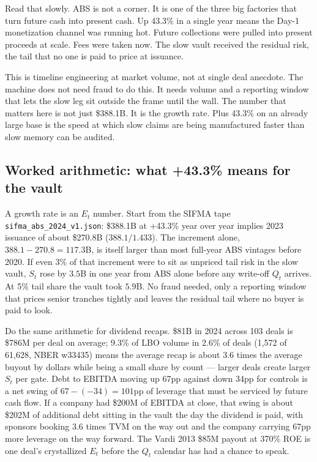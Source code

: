 Read that slowly. ABS is not a corner. It is one of the three big factories that turn future cash into present cash. Up 43.3\% in a single year means the Day-1 monetization channel was running hot. Future collections were pulled into present proceeds at scale. Fees were taken now. The slow vault received the residual risk, the tail that no one is paid to price at issuance.

This is timeline engineering at market volume, not at single deal anecdote. The machine does not need fraud to do this. It needs volume and a reporting window that lets the slow leg sit outside the frame until the wall. The number that matters here is not just \$388.1B. It is the growth rate. Plus 43.3\% on an already large base is the speed at which slow claims are being manufactured faster than slow memory can be audited.

\subsection*{Worked arithmetic: what +43.3\% means for the vault}

A growth rate is an $E_t$ number. Start from the SIFMA tape \texttt{sifma\_abs\_2024\_v1.json}: \$388.1B at +43.3\% year over year implies 2023 issuance of about \$270.8B ($388.1 / 1.433$). The increment alone, $388.1 - 270.8 = 117.3$B, is itself larger than most full-year ABS vintages before 2020. If even 3\% of that increment were to sit as unpriced tail risk in the slow vault, $S_t$ rose by $3.5$B in one year from ABS alone before any write-off $Q_t$ arrives. At 5\% tail share the vault took $5.9$B. No fraud needed, only a reporting window that prices senior tranches tightly and leaves the residual tail where no buyer is paid to look.

Do the same arithmetic for dividend recaps. \$81B in 2024 across 103 deals is \$786M per deal on average; 9.3\% of LBO volume in 2.6\% of deals (1,572 of 61,628, NBER w33435) means the average recap is about 3.6 times the average buyout by dollars while being a small share by count — larger deals create larger $S_t$ per gate. Debt to EBITDA moving up 67pp against down 34pp for controls is a net swing of $67 - (-34) = 101$pp of leverage that must be serviced by future cash flow. If a company had \$200M of EBITDA at close, that swing is about \$202M of additional debt sitting in the vault the day the dividend is paid, with sponsors booking 3.6 times TVM on the way out and the company carrying 67pp more leverage on the way forward. The Vardi 2013 \$85M payout at 370\% ROE is one deal's crystallized $E_t$ before the $Q_t$ calendar has had a chance to speak.

